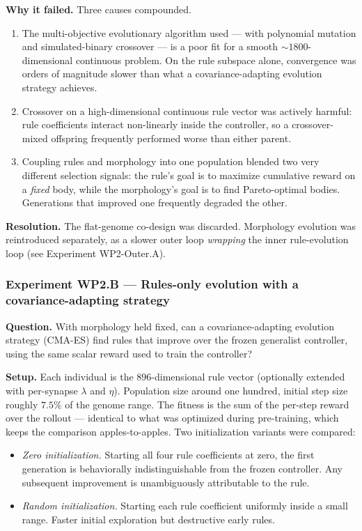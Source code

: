 \documentclass[letterpaper,10pt]{article}
\begin{document}
\textbf{Why it failed.} Three causes compounded.
\begin{enumerate}
    \item The multi-objective evolutionary algorithm used --- with polynomial mutation and simulated-binary crossover --- is a poor fit for a smooth $\sim 1800$-dimensional continuous problem. On the rule subspace alone, convergence was orders of magnitude slower than what a covariance-adapting evolution strategy achieves.
    \item Crossover on a high-dimensional continuous rule vector was actively harmful: rule coefficients interact non-linearly inside the controller, so a crossover-mixed offspring frequently performed worse than either parent.
    \item Coupling rules and morphology into one population blended two very different selection signals: the rule's goal is to maximize cumulative reward on a \emph{fixed} body, while the morphology's goal is to find Pareto-optimal bodies. Generations that improved one frequently degraded the other.
\end{enumerate}
\textbf{Resolution.} The flat-genome co-design was discarded. Morphology evolution was reintroduced separately, as a slower outer loop \emph{wrapping} the inner rule-evolution loop (see Experiment WP2-Outer.A).

\subsubsection{Experiment WP2.B --- Rules-only evolution with a covariance-adapting strategy}
\textbf{Question.} With morphology held fixed, can a covariance-adapting evolution strategy (CMA-ES) find rules that improve over the frozen generalist controller, using the same scalar reward used to train the controller?

\textbf{Setup.} Each individual is the $896$-dimensional rule vector (optionally extended with per-synapse $\lambda$ and $\eta$). Population size around one hundred, initial step size roughly $7.5\%$ of the genome range. The fitness is the sum of the per-step reward over the rollout --- identical to what was optimized during pre-training, which keeps the comparison apples-to-apples. Two initialization variants were compared:
\begin{itemize}
    \item \emph{Zero initialization.} Starting all four rule coefficients at zero, the first generation is behaviorally indistinguishable from the frozen controller. Any subsequent improvement is unambiguously attributable to the rule.
    \item \emph{Random initialization.} Starting each rule coefficient uniformly inside a small range. Faster initial exploration but destructive early rules.
\end{itemize}
\end{document}
